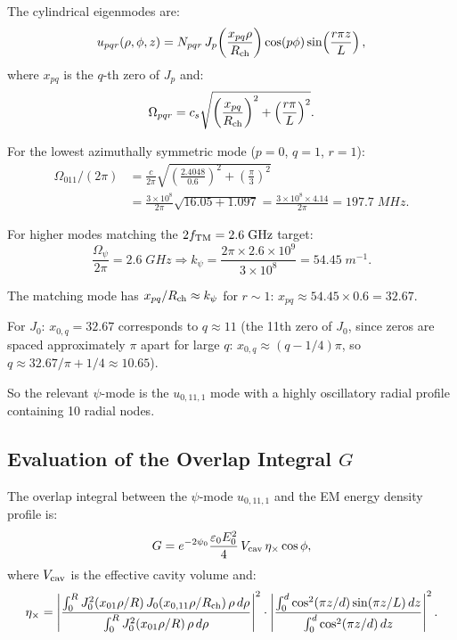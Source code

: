 \documentclass[aps,prd,twocolumn,superscriptaddress,nofootinbib]{revtex4-2}
\newcommand{\ee}[1]{\times 10^{#1}}
\begin{document}
The cylindrical eigenmodes are:
\begin{equation}
u_{pqr}(\rho,\phi,z) = N_{pqr}\,J_p\!\left(\frac{x_{pq}\rho}{R_{\rm ch}}\right)\cos(p\phi)\sin\!\left(\frac{r\pi z}{L}\right),
\label{eq:psi-mode}
\end{equation}
where $x_{pq}$ is the $q$-th zero of $J_p$ and:
\begin{equation}
\Omega_{pqr} = c_s\sqrt{\left(\frac{x_{pq}}{R_{\rm ch}}\right)^2 + \left(\frac{r\pi}{L}\right)^2}.
\end{equation}

For the lowest azimuthally symmetric mode ($p = 0$, $q = 1$, $r = 1$):
\begin{align}
\Omega_{011}/(2\pi) &= \frac{c}{2\pi}\sqrt{\left(\frac{2.4048}{0.6}\right)^2 + \left(\frac{\pi}{3}\right)^2} \nonumber\\
&= \frac{3\ee{8}}{2\pi}\sqrt{16.05 + 1.097} = \frac{3\ee{8}\times4.14}{2\pi} = 197.7\;\si{MHz}.
\end{align}

For higher modes matching the $2f_{\rm TM} = 2.6\;\si{GHz}$ target:
\begin{equation}
\frac{\Omega_\psi}{2\pi} = 2.6\;\si{GHz} \Rightarrow k_\psi = \frac{2\pi\times2.6\ee{9}}{3\ee{8}} = 54.45\;\si{m^{-1}}.
\end{equation}

The matching mode has
$x_{pq}/R_{\rm ch} \approx k_\psi$ for $r \sim 1$:
$x_{pq} \approx 54.45 \times 0.6 = 32.67$.

For $J_0$: $x_{0,q} = 32.67$ corresponds to $q \approx 11$
(the 11th zero of $J_0$, since zeros are spaced approximately
$\pi$ apart for large $q$: $x_{0,q} \approx (q-1/4)\pi$,
so $q \approx 32.67/\pi + 1/4 \approx 10.65$).

So the relevant $\psi$-mode is the $u_{0,11,1}$ mode with
a highly oscillatory radial profile containing 10 radial nodes.

\subsection{Evaluation of the Overlap Integral $G$}

The overlap integral between the $\psi$-mode $u_{0,11,1}$
and the EM energy density profile is:
\begin{equation}
G = e^{-2\psi_0}\frac{\varepsilon_0 E_0^2}{4}\,V_{\rm cav}\,\eta_\times\cos\phi,
\label{eq:G-result}
\end{equation}
where $V_{\rm cav}$ is the effective cavity volume and:
\begin{equation}
\eta_\times = \left|\frac{\int_0^{R} J_0^2(x_{01}\rho/R)\,J_0(x_{0,11}\rho/R_{\rm ch})\,\rho\,d\rho}
{\int_0^{R} J_0^2(x_{01}\rho/R)\,\rho\,d\rho}\right|^2
\cdot \left|\frac{\int_0^d \cos^2(\pi z/d)\sin(\pi z/L)\,dz}
{\int_0^d \cos^2(\pi z/d)\,dz}\right|^2.
\label{eq:eta-cross}
\end{equation}
\end{document}
